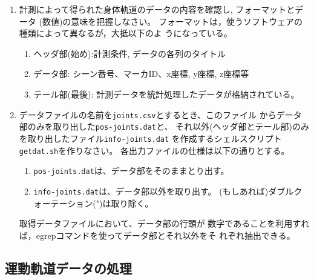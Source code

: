 \documentclass{jarticle}
\begin{document}
\begin{enumerate}
\item 計測によって得られた身体軌道のデータの内容を確認し, フォーマットとデータ
  (数値)の意味を把握しなさい。
  フォーマットは，使うソフトウェアの種類によって異なるが，大抵以下のよ
  うになっている。
  \begin{enumerate}
  \item ヘッダ部(始め):計測条件, データの各列のタイトル
  \item データ部: シーン番号、マーカID、x座標, y座標, z座標等
  \item テール部(最後): 計測データを統計処理したデータが格納されている。
  \end{enumerate}
\item データファイルの名前を\verb|joints.csv|とするとき、このファイル
  からデータ部のみを取り出した\verb|pos-joints.dat|と、
  それ以外(ヘッダ部とテール部)のみを取り出したファイル\verb|info-joints.dat|
  を作成するシェルスクリプト\verb|getdat.sh|を作りなさい。
  各出力ファイルの仕様は以下の通りとする。
  \begin{enumerate}
  \item \verb|pos-joints.dat|は、データ部をそのままとり出す。
  \item \verb|info-joints.dat|は、データ部以外を取り出す。
    (もしあれば)ダブルクォーテーション(")は取り除く。
  \end{enumerate}
  取得データファイルにおいて、データ部の行頭が
  数字であることを利用すれば，egrepコマンドを使ってデータ部とそれ以外をそ
  れぞれ抽出できる。
\end{enumerate}


\subsection{運動軌道データの処理}
\end{document}
